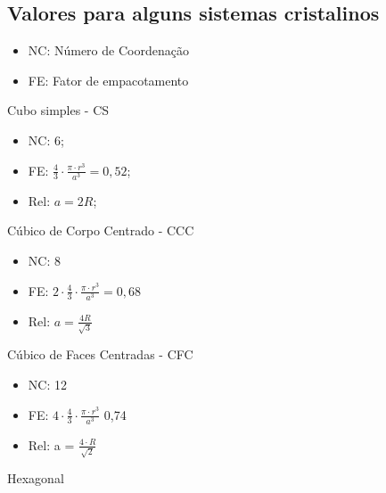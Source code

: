 \subsection*{Valores para alguns sistemas cristalinos}

\begin{itemize}
	\setlength{\parskip}{0pt}
	\setlength{\itemsep}{0pt plus 1pt}
	
	\item NC: Número de Coordenação
	\item FE: Fator de empacotamento
\end{itemize}


Cubo simples - CS




\begin{itemize}
	\item NC: 6;
	\item FE: $\frac{4}{3} \cdot \frac{\pi \cdot r^{3}}{a^{3}} = 0,52$;
	\item Rel: $a = 2R$;	
\end{itemize}


Cúbico de Corpo Centrado - CCC

\begin{itemize}
	\item NC: 8
	\item FE: $2 \cdot \frac{4}{3} \cdot \frac{\pi \cdot r^{3}}{a^{3}} = 0,68$
	\item Rel: $a = \frac{4R}{\sqrt{3}}$
\end{itemize}


Cúbico de Faces Centradas - CFC

\begin{itemize}
	\setlength{\parskip}{0pt}
	\setlength{\itemsep}{0pt plus 1pt}
	
	\item NC: 12
	\item FE: $4 \cdot \frac{4}{3} \cdot \frac{\pi \cdot r^{3}}{a^{3}}$ 0,74
	\item Rel: a = $\frac{4 \cdot R}{\sqrt{2}}$
\end{itemize}

Hexagonal


